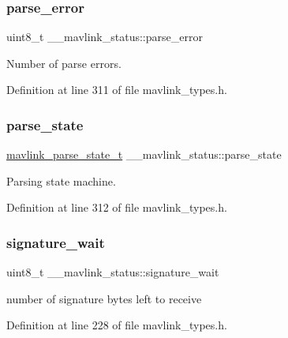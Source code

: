 \subsubsection{\texorpdfstring{parse\_error}{parse\_error}}
{\footnotesize\ttfamily uint8\+\_\+t \+\_\+\+\_\+mavlink\+\_\+status\+::parse\+\_\+error}



Number of parse errors. 



Definition at line 311 of file mavlink\+\_\+types.\+h.

\mbox{\label{struct____mavlink__status_aaf6742a61bbc641a4600184b3260fa0f}} 
\subsubsection{\texorpdfstring{parse\_state}{parse\_state}}
{\footnotesize\ttfamily \mbox{\hyperlink{include__v0_89_2mavlink__types_8h_a4eeb14ddb07e997fe1d671d6823e35a1}{mavlink\+\_\+parse\+\_\+state\+\_\+t}} \+\_\+\+\_\+mavlink\+\_\+status\+::parse\+\_\+state}



Parsing state machine. 



Definition at line 312 of file mavlink\+\_\+types.\+h.

\mbox{\label{struct____mavlink__status_afbdd26652864ceeccf1155287752496c}} 
\subsubsection{\texorpdfstring{signature\_wait}{signature\_wait}}
{\footnotesize\ttfamily uint8\+\_\+t \+\_\+\+\_\+mavlink\+\_\+status\+::signature\+\_\+wait}



number of signature bytes left to receive 



Definition at line 228 of file mavlink\+\_\+types.\+h.

\mbox{\label{struct____mavlink__status_a12ca1a2ade1b6b83d87a8cd7553884a9}} 
